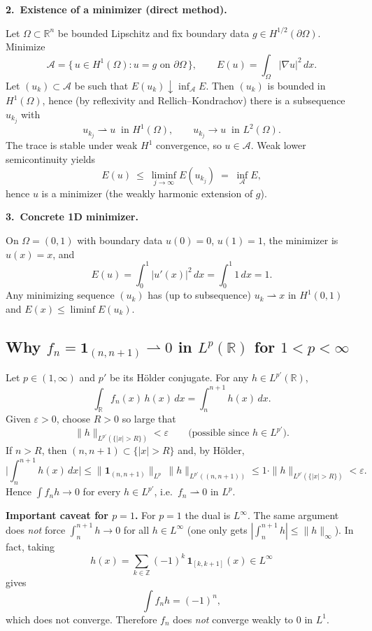 \documentclass[12pt,a4paper]{article}
\theoremstyle{plain}
\theoremstyle{definition}
\theoremstyle{remark}
\theoremstyle{remark}
\theoremstyle{definition}
\begin{document}
\medskip
\noindent\textbf{2.\ Existence of a minimizer (direct method).}\par
\noindent
Let $\Omega\subset\mathbb{R}^{n}$ be bounded Lipschitz and fix boundary data $g\in H^{1/2}(\partial\Omega)$.
Minimize
\[
\mathcal{A}=\{\,u\in H^{1}(\Omega): u=g \text{ on }\partial\Omega\,\},\qquad
E(u)=\int_{\Omega}|\nabla u|^{2}\,dx.
\]
Let $(u_k)\subset\mathcal{A}$ be such that $E(u_k)\downarrow\inf_{\mathcal{A}}E$. Then $(u_k)$ is bounded in $H^{1}(\Omega)$,
hence (by reflexivity and Rellich–Kondrachov) there is a subsequence $u_{k_j}$ with
\[
u_{k_j}\rightharpoonup u \ \text{ in } H^{1}(\Omega),\qquad u_{k_j}\to u \ \text{ in } L^{2}(\Omega).
\]
The trace is stable under weak $H^1$ convergence, so $u\in\mathcal{A}$. Weak lower semicontinuity yields
\[
E(u)\ \le\ \liminf_{j\to\infty} E(u_{k_j}) \;=\; \inf_{\mathcal{A}}E,
\]
hence $u$ is a minimizer (the weakly harmonic extension of $g$).

\medskip
\noindent\textbf{3.\ Concrete 1D minimizer.}\par
\noindent
On $\Omega=(0,1)$ with boundary data $u(0)=0$, $u(1)=1$, the minimizer is $u(x)=x$, and
\[
E(u)=\int_0^1 |u'(x)|^{2}\,dx=\int_0^1 1\,dx=1.
\]
Any minimizing sequence $(u_k)$ has (up to subsequence) $u_k\rightharpoonup x$ in $H^{1}(0,1)$ and
$E(x)\le\liminf E(u_k)$.

	\subsection*{Why $f_n=\mathbf 1_{(n,n+1)} \rightharpoonup 0$ in $L^p(\mathbb R)$ for $1<p<\infty$}
	
	Let $p\in(1,\infty)$ and $p'$ be its H\"older conjugate. For any $h\in L^{p'}(\mathbb R)$,
	\[
	\int_{\mathbb R} f_n(x)\,h(x)\,dx=\int_{n}^{n+1} h(x)\,dx.
	\]
	Given $\varepsilon>0$, choose $R>0$ so large that
	\[
	\|h\|_{L^{p'}(\{|x|>R\})}<\varepsilon
	\qquad\text{(possible since $h\in L^{p'}$).}
	\]
	If $n>R$, then $(n,n+1)\subset\{|x|>R\}$ and, by H\"older,
	\[
	\Big|\int_{n}^{n+1} h(x)\,dx\Big|
	\le \|\mathbf 1_{(n,n+1)}\|_{L^p}\,\|h\|_{L^{p'}((n,n+1))}
	\le 1\cdot \|h\|_{L^{p'}(\{|x|>R\})}
	<\varepsilon.
	\]
	Hence $\int f_n h\to 0$ for every $h\in L^{p'}$, i.e.\ $f_n\rightharpoonup 0$ in $L^p$.
	
	\bigskip
	\noindent\textbf{Important caveat for $p=1$.}
	For $p=1$ the dual is $L^\infty$. The same argument does \emph{not} force
	$\int_{n}^{n+1} h \to 0$ for all $h\in L^\infty$ (one only gets $|\int_{n}^{n+1} h|\le \|h\|_\infty$).
	In fact, taking
	\[
	h(x)=\sum_{k\in\mathbb Z}(-1)^k\,\mathbf 1_{[k,k+1]}(x)\in L^\infty
	\]
	gives
	\[
	\int f_n h = (-1)^n,
	\]
	which does not converge. Therefore $f_n$ does \emph{not} converge weakly to $0$ in $L^1$.
	
\end{document}
